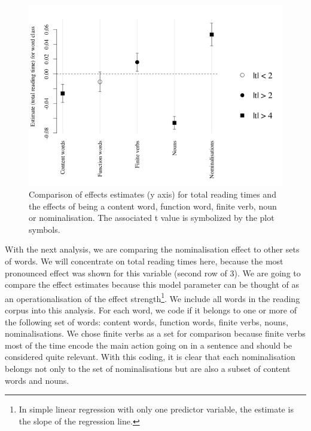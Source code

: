 \documentclass[output=paper]{langsci/langscibook}
\begin{document}
 
\begin{figure}
 \includegraphics[width=\textwidth]{figures/Wolfer1.png}
\caption{Comparison of effects estimates (y axis) for total reading times and the effects of being a content word, function word, finite verb, noun or nominalisation. The associated t value is symbolized by the plot symbols.}
 \label{fig:1}
\end{figure} 


With the next analysis, we are comparing the nominalisation effect to other sets of words. We will concentrate on total reading times here, because the most pronounced effect was shown for this variable (second row of 3). We are going to compare the effect estimates because this model parameter can be thought of as an operationalisation of the effect strength\footnote{In simple linear regression with only one predictor variable, the estimate is the slope of the regression line.}. We include all words in the reading corpus into this analysis. For each word, we code if it belongs to one or more of the following set of words: content words, function words, finite verbs, nouns, nominalisations. We chose finite verbs as a set for comparison because finite verbs most of the time encode the main action going on in a sentence and should be considered quite relevant. With this coding, it is clear that each nominalisation belongs not only to the set of nominalisations but are also a subset of content words and nouns. 
\end{document}
